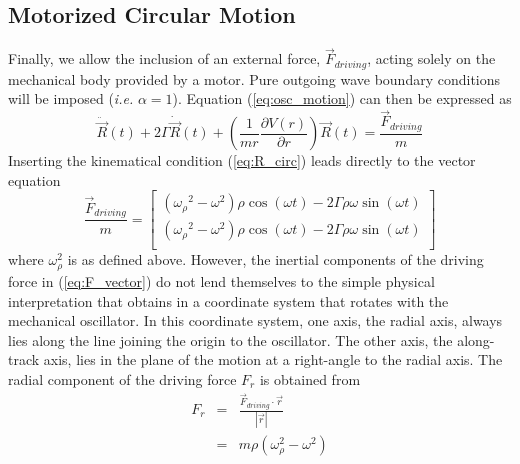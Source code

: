 \subsection{Motorized Circular Motion}

Finally, we allow the inclusion of an external force, 
${\vec F}_{driving}$, acting solely on the mechanical body 
provided by a motor.
Pure outgoing wave boundary conditions will be imposed 
(\emph{i.e.} $\alpha =1$).
Equation (\ref{eq:osc_motion}) can then be expressed as 
\begin{equation}\label{eq:forced_osc_motion}
    {\ddot {\vec R}}(t) + 2 \Gamma {\dot {\vec R}}(t) + 
\left(\frac{1}{m r} \frac{\partial V(r)}{\partial r} \right) {\vec R}(t) = 
\frac{{\vec F}_{driving}}{m}
\end{equation}
Inserting the kinematical condition (\ref{eq:R_circ}) leads directly 
to the vector equation 
\begin{equation}\label{eq:F_vector}
\frac{{\vec F}_{driving}}{m} =
                  \left[
			       \begin{array}{c}
				    \left(
					  {\omega _{\rho}}^2 - \omega^2
					\right) \rho \cos(\omega t) 
					  - 2 \Gamma \rho \omega \sin( \omega t)\\
				    \left(
					  {\omega _{\rho}}^2 - \omega^2
					\right) \rho \cos(\omega t) 
					  - 2 \Gamma \rho \omega \sin( \omega t)\\
    		       \end{array}
			      \right]
\end{equation}
where ${\omega _{\rho}^2}$ is as defined above.
However, the inertial components of the driving force in 
(\ref{eq:F_vector}) do not lend themselves to the simple physical 
interpretation that obtains in a coordinate system that rotates 
with the mechanical oscillator.  
In this coordinate system, one axis, the radial axis, always lies 
along the line joining the origin to the oscillator. 
The other axis, the along-track axis, lies in the plane of the 
motion at a right-angle to the radial axis.  
The radial component of the driving force $F_r$ is obtained from 
\begin{eqnarray}\label{eq:F_r}
	F_r & = &  
		\frac{ {\vec F}_{driving} \cdot {\vec r} }{|{\vec r}|} \nonumber \\
            & = & m \rho \left(
			               {\omega _{\rho}^2} - \omega^2
                         \right)  
\end{eqnarray}

